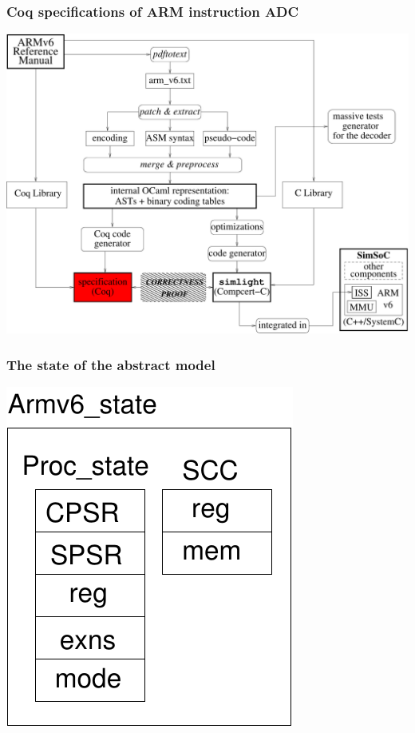 \documentclass[usenames,dvipsnames]{beamer} %
\begin{document}
\begin{frame}
\frametitle{Coq specifications of ARM instruction ADC}
\hfil\includegraphics[width=.9\linewidth]{fig/highlight_abstract.pdf}
\end{frame}

\begin{frame}
\frametitle{The state of the abstract model}
\begin{center}
\includegraphics[width=.4\linewidth]{fig/abstr_st.pdf}
\end{center}
\end{frame}
\end{document}
